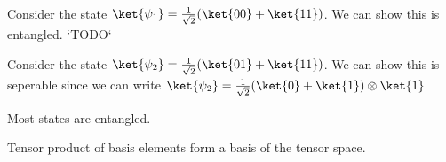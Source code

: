 \begin{eg}
Consider the state $\ket{\psi_1} = \frac{1}{\sqrt{2}} (\ket{00} + \ket{11})$. We can show this is entangled. `TODO`
\end{eg}

\begin{eg}
Consider the state $\ket{\psi_2} = \frac{1}{\sqrt{2}} (\ket{01} + \ket{11})$. We can show this is seperable since we can write $\ket{\psi_2} = \frac{1}{\sqrt{2}} (\ket{0} + \ket{1}) \otimes \ket{1}$
\end{eg}

\begin{lemma}
    Most states are entangled.
\end{lemma}

\begin{lemma}
    Tensor product of basis elements form a basis of the tensor space.
\end{lemma}
